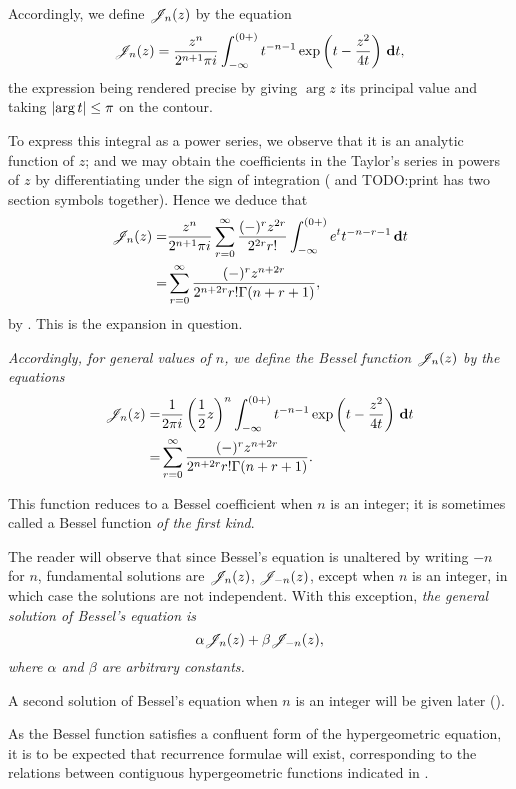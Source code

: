 Accordingly, we define $\mathscr{J}_{n}(z)$ by the equation
$$
\mathscr{J}_{n}(z) 
= 
\frac{z^{n}}{2^{n+1}\pi i}
\int_{-\infty}^{(0+)}
t^{-n-1} 
\exp\left(  t - \frac{z^{2}}{4t}   \right)
\, \mathbf{d} t,
$$
the expression being rendered precise by giving
$\arg z$ its principal value and taking
$\left|  \arg t  \right| \leq \pi$ on the contour.

To express this integral as a power series, we observe that it is an
analytic function of $z$; and we may obtain the coefficients in the
Taylor's series in powers of $z$ by differentiating under the sign of 
integration
( and 
TODO:print has two section symbols together).
Hence we deduce that
\begin{align*}
  \mathscr{J}_{n}(z)
  =& \frac{z^{n}}{2^{n+1}\pi i}
  \sum_{r=0}^{\infty} \frac{ (-)^{r} z^{2r}  }{ 2^{2r} r!  }
  \int_{-\infty}^{(0+)}
  e^{t}
  t^{-n-r-1}
  \, \mathbf{d} t
  \\
  =&
  \sum_{r=0}^{\infty}
  \frac{ (-)^{r} z^{n+2r}  }{ 2^{n+2r} r! \Gamma(n+r+1)  },
\end{align*}
by . This is the expansion in question.

% 
% 
\emph{Accordingly, for general values of $n$, we define the
  \emph{Bessel function} $\mathscr{J}_{n}(z)$ by the equations}
\begin{align*}
  \mathscr{J}_{n}(z)
  =& \frac{1}{2\pi i} \left( \frac{1}{2} z \right)^{n}
  \int_{-\infty}^{(0+)}
  t^{-n-1}
  \exp\left(  t - \frac{z^{2}}{4t}   \right)
  \, \mathbf{d} t
  \\
  =&
  \sum_{r=0}^{\infty}
  \frac{ (-)^{r} z^{n+2r}  }{ 2^{n+2r} r! \Gamma(n+r+1)  }.
\end{align*}

This function reduces to a Bessel coefficient when $n$ is an integer;
it is sometimes called a Bessel function \emph{of the first kind}.

The reader will observe that since Bessel's equation is unaltered by
writing $-n$ for $n$, fundamental solutions are $\mathscr{J}_{n}(z)$, $\mathscr{J}_{-n}(z)$,
except when $n$ is an integer, in which case the solutions are not
independent. With this exception, \emph{the general solution of
  Bessel's equation is
  $$
  \alpha \mathscr{J}_{n}(z) + \beta \mathscr{J}_{-n}(z),
  $$
  where $\alpha$ and $\beta$ are arbitrary constants.}

A second solution of Bessel's equation when $n$ is an integer will be
given later ().

As the Bessel function satisfies a confluent form of the
hypergeometric equation, it is to be expected that recurrence formulae
will exist, corresponding to the relations between contiguous
hypergeometric functions indicated in .

